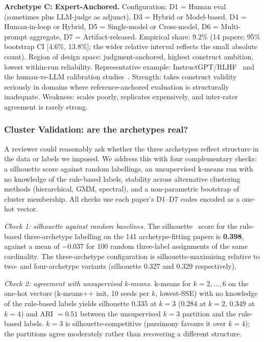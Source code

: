 \documentclass[acmsmall, nonacm, screen]{acmart}
\begin{document}
\textbf{Archetype C: Expert-Anchored.}
Configuration: D1 = Human eval (sometimes plus LLM-judge as
adjunct), D3 = Hybrid or Model-based, D4 = Human-in-loop or Hybrid,
D5 = Single-model or Cross-model, D6 = Multi-prompt aggregate,
D7 = Artifact-released. Empirical share: 9.2\% (14 papers; 95\%
bootstrap CI [4.6\%, 13.8\%]; the wider relative interval reflects
the small absolute count). Region of design space: judgment-anchored,
highest construct ambition, lowest within-run reliability.
Representative example: InstructGPT/RLHF~\cite{ouyang2022training}
and the human-vs-LLM calibration
studies~\cite{llmvshuman2024, humansorllm2024, canlllmsreplace2023}.
Strength: takes construct validity seriously in domains where
reference-anchored evaluation is structurally inadequate. Weakness:
scales poorly, replicates expensively, and inter-rater agreement is
rarely strong.

\subsubsection{Cluster Validation: are the archetypes real?}
\label{subsubsec:clustervalidation}
A reviewer could reasonably ask whether the three archetypes reflect
structure in the data or labels we imposed. We address this with
four complementary checks: a silhouette score against random
labellings, an unsupervised k-means run with no knowledge of the
rule-based labels, stability across alternative clustering methods
(hierarchical, GMM, spectral), and a non-parametric bootstrap of
cluster membership. All checks use each paper's D1--D7 codes encoded
as a one-hot vector.

\emph{Check 1: silhouette against random baselines.} The
silhouette~\cite{rousseeuw1987silhouettes} score for the rule-based
three-archetype labelling on the 141 archetype-fitting papers is
\textbf{0.398}, against a mean of $-0.037$ for 100 random three-label
assignments of the same cardinality. The
three-archetype configuration is silhouette-maximising relative to
two- and four-archetype variants (silhouette 0.327 and 0.329
respectively).

\emph{Check 2: agreement with unsupervised k-means.} k-means for
$k=2,\ldots,6$ on the one-hot vectors (k-means++ init, 10 seeds per
$k$, lowest-SSE) with no knowledge of the rule-based labels yields
silhouette $0.335$ at $k=3$ ($0.284$ at $k=2$, $0.349$ at $k=4$) and
ARI $=0.51$ between the unsupervised $k=3$ partition and the
rule-based labels. $k=3$ is silhouette-competitive (parsimony
favours it over $k=4$); the partitions agree moderately rather than
recovering a different structure.
\end{document}
